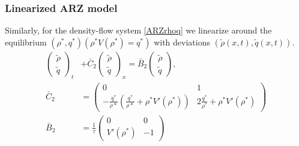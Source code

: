 \documentclass[a4paper, 10pt, conference]{ieeeconf}      %
\begin{document}
\subsubsection{Linearized ARZ model}
Similarly, for the density-flow system \eqref{ARZrhoq} we linearize around the equilibrium $(\rho^*, q^*)(\rho^*V(\rho^*) = q^*)$ with deviations $(\tilde{\rho}(x,t), \tilde{q}(x,t))$.
{\footnotesize
\begin{align}
\label{eq:rhoqlin}
\begin{pmatrix}
	\tilde{\rho} \\
	\tilde{q}
\end{pmatrix}_t
&+ \bar{C}_2
\begin{pmatrix}
	\tilde{\rho} \\ 
	\tilde{q}
\end{pmatrix}_x 
= 
\bar{B}_2
\begin{pmatrix}
	\tilde{\rho} \\
	\tilde{q}
\end{pmatrix}, \\
\bar{C}_2 &=
\begin{pmatrix}
	0 & 1 \\
	-\frac{q^{*}}{\rho{*}} \left(
		\frac{q^{*}}{\rho{*}} + \rho^{*} V'\left( \rho^{*} \right) \right) & 2 \frac{q^{*}}{\rho^{*}} + \rho^{*} V'\left( \rho^{*} \right)
\end{pmatrix} \\
\bar{B}_2 &=
\frac{1}{\tau}
\begin{pmatrix}
	0 & 0 \\
	V'\left( \rho^{*} \right) & -1
\end{pmatrix}
\end{align}
}
\end{document}
